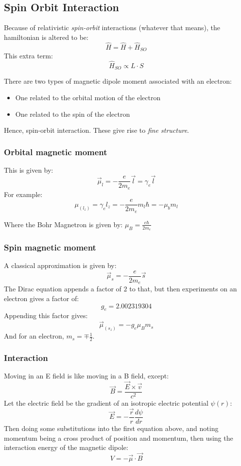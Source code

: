 \documentclass[12pt]{article}
\begin{document}
\subsection{Spin Orbit Interaction}
Because of relativistic \textit{spin-orbit} interactions (whatever that means), the hamiltonian is altered to be:
\[ \hat{H} = \hat{H} + \hat{H}_{SO}\]
This extra term:
\[ \hat{H}_{SO} \propto L \cdot S \]

There are two types of magnetic dipole moment associated with an electron:
\begin{itemize}
    \item One related to the orbital motion of the electron
    \item One related to the spin of the electron
\end{itemize}
Hence, spin-orbit interaction. These give rise to \textit{fine structure}.

\subsubsection{Orbital magnetic moment}
This is given by:
\[ \vec{\mu}_l = -\frac{e}{2m_e}\vec{l} = \gamma_e \vec{l}\]
For example:
\[\mu_{(l_z)} = \gamma_e l_z = -\frac{e}{2m_e}m_l\hbar = -\mu_bm_l\]

Where the Bohr Magnetron is given by: \(\mu_B = \frac{e\hbar}{2m_e}\)

\subsubsection{Spin magnetic moment}
A classical approximation is given by:
\[ \vec{\mu}_s = -\frac{e}{2m_e}\vec{s}\]
The Dirac equation appends a factor of $2$ to that, but then experiments on an electron gives a factor of:
\[g_e = 2.002319304\]
Appending this factor gives:
\[ \vec{\mu}_{(s_z)} = -g_e \mu_B m_s \]
And for an electron, $m_s =\mp \frac12$.

\subsubsection{Interaction}
Moving in an E field is like moving in a B field, except:
\[ \vec{B} = \frac{\vec{E}\times \vec{v}}{c^2}\]
Let the electric field be the gradient of an isotropic electric potential $\psi(r)$:
\[ \vec{E} = -\frac{\vec{r}}{r}\frac{d\psi}{dr}\]
Then doing some substitutions into the first equation above, and noting momentum being a cross product of position and momentum, then using the interaction energy of the magnetic dipole:
\[ V = -\vec{\mu} \cdot \vec{B}\]
\end{document}
